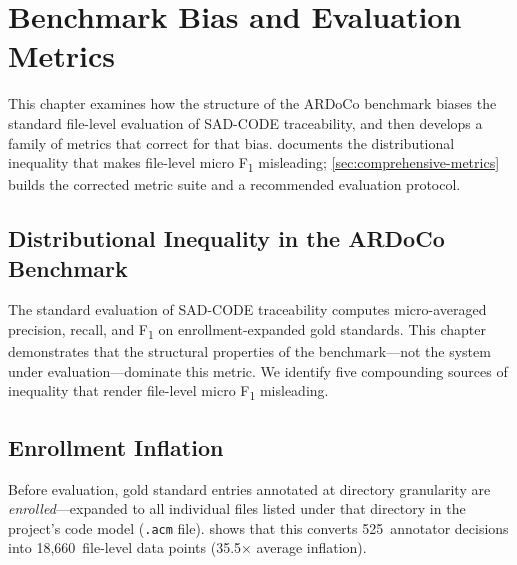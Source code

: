 \documentclass[11pt,a4paper]{report}
\newcommand{\sadcode}{SAD-CODE\xspace}
\newcommand{\fone}{F\textsubscript{1}\xspace}
\begin{document}



\chapter{Benchmark Bias and Evaluation Metrics}
\label{ch:bias}

This chapter examines how the structure of the ARDoCo benchmark biases the standard file-level evaluation of \sadcode traceability, and then develops a family of metrics that correct for that bias.  documents the distributional inequality that makes file-level micro \fone misleading; \cref{sec:comprehensive-metrics} builds the corrected metric suite and a recommended evaluation protocol.

\section{Distributional Inequality in the ARDoCo Benchmark}
\label{sec:distributional-inequality}
\label{ch:inequality}

The standard evaluation of \sadcode traceability computes micro-averaged
precision, recall, and \fone on enrollment-expanded gold standards. This
chapter demonstrates that the structural properties of the benchmark---not the
system under evaluation---dominate this metric. We identify five compounding
sources of inequality that render file-level micro \fone misleading.

\section{Enrollment Inflation}
\label{sec:ineq:enrollment}

Before evaluation, gold standard entries annotated at directory granularity are
\emph{enrolled}---expanded to all individual files listed under that directory
in the project's code model (\texttt{.acm} file).  shows
that this converts 525~annotator decisions into 18,660~file-level data points
(35.5$\times$ average inflation).
\end{document}
